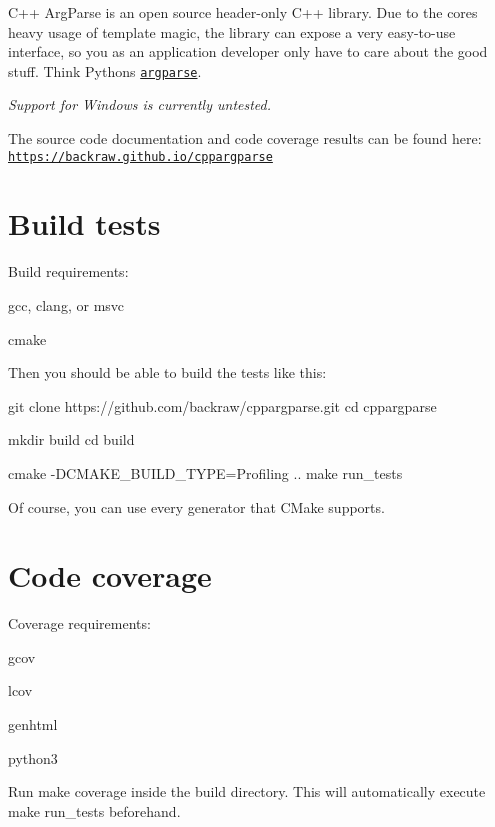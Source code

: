 C++ Arg\+Parse is an open source header-\/only C++ library. Due to the core\textquotesingle{}s heavy usage of template magic, the library can expose a very easy-\/to-\/use interface, so you as an application developer only have to care about the good stuff. Think Python\textquotesingle{}s \href{https://docs.python.org/3/library/argparse.html}{\tt argparse}.

{\itshape Support for Windows is currently untested.}

\href{https://travis-ci.org/backraw/cppargparse}{\tt }

The source code documentation and code coverage results can be found here\+: \href{https://backraw.github.io/cppargparse}{\tt https\+://backraw.\+github.\+io/cppargparse}

\section*{Build tests}

Build requirements\+:
\begin{DoxyItemize}
\item {\ttfamily gcc}, {\ttfamily clang}, or {\ttfamily msvc}
\item {\ttfamily cmake}
\end{DoxyItemize}

Then you should be able to build the tests like this\+: 
\begin{DoxyCode}
git clone https://github.com/backraw/cppargparse.git
cd cppargparse

mkdir build
cd build

cmake -DCMAKE\_BUILD\_TYPE=Profiling ..
make run\_tests
\end{DoxyCode}


Of course, you can use every generator that C\+Make supports.

\section*{Code coverage}

Coverage requirements\+:
\begin{DoxyItemize}
\item {\ttfamily gcov}
\item {\ttfamily lcov}
\item {\ttfamily genhtml}
\item {\ttfamily python3}
\end{DoxyItemize}

Run {\ttfamily make coverage} inside the build directory. This will automatically execute {\ttfamily make run\+\_\+tests} beforehand.

